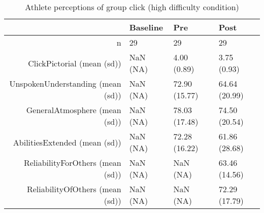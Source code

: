 \begin{table}[ht]
\centering
\begin{tabular}{rlll}
  \hline
 & Baseline & Pre & Post \\ 
  \hline
n &  29 &    29 &    29 \\ 
  ClickPictorial (mean (sd)) & NaN (NA) &  4.00 (0.89) &  3.75 (0.93) \\ 
  UnspokenUnderstanding (mean (sd)) & NaN (NA) & 72.90 (15.77) & 64.64 (20.99) \\ 
  GeneralAtmosphere (mean (sd)) & NaN (NA) & 78.03 (17.48) & 74.50 (20.54) \\ 
  AbilitiesExtended (mean (sd)) & NaN (NA) & 72.28 (16.22) & 61.86 (28.68) \\ 
  ReliabilityForOthers (mean (sd)) & NaN (NA) &   NaN (NA) & 63.46 (14.56) \\ 
  ReliabilityOfOthers (mean (sd)) & NaN (NA) &   NaN (NA) & 72.29 (17.79) \\ 
   \hline
\end{tabular}
\caption{Athlete perceptions of 
 group click (high difficulty condition)} 
\end{table}
